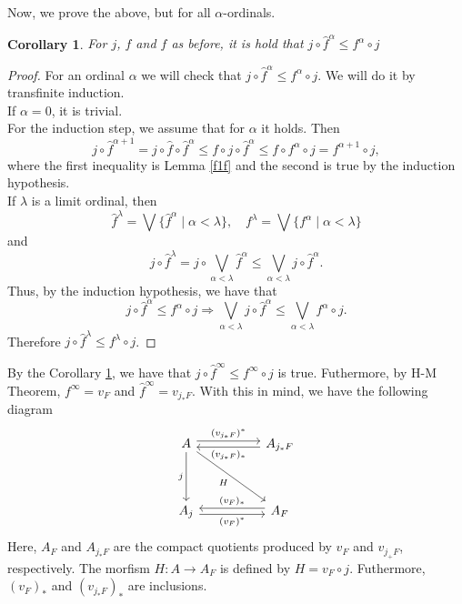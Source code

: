 \documentclass[11pt]{amsart}
\theoremstyle{plain}
\newtheorem{cor}[thm]{Corollary}
\theoremstyle{definition}
\begin{document}
Now, we prove the above, but for all $\alpha$-ordinals.\\

\begin{cor}\label{finftyf}
    For $j$, $f$ and $\hat{f}$ as before, it is hold that $j\circ \hat{f}^\alpha\leq f^\alpha\circ j$
\end{cor}

\begin{proof}
    For an ordinal $\alpha$ we will check that $j\circ \hat{f}^\alpha\leq f^\alpha\circ j$. We will do it by transfinite induction.\\

    If $\alpha=0$, it is trivial.\\

    For the induction step, we assume that for $\alpha$ it holds. Then
    \[
    j\circ \hat{f}^{\alpha+1}=j\circ \hat{f}\circ \hat{f}^{\alpha}\leq  f\circ j\circ \hat{f}^\alpha\leq f\circ f^\alpha\circ j=f^{\alpha+1}\circ j,
    \]
    where the first inequality is Lemma \ref{f1f} and the second is true by the induction hypothesis.\\

    If $\lambda$ is a limit ordinal, then
	\[
	\hat{f}^\lambda=\bigvee\{\hat{f}^\alpha\mid \alpha<\lambda\}, \quad f^\lambda=\bigvee\{f^\alpha\mid \alpha<\lambda\} 
	\]
	and 
	\[
		j\circ \hat{f}^\lambda=j\circ \bigvee_{\alpha<\lambda}\hat{f}^\alpha\leq\bigvee_{\alpha<\lambda}j\circ \hat{f}^\alpha.
	\]
	Thus, by the induction hypothesis, we have that
	\[
	j\circ \hat{f}^\alpha\leq f^\alpha\circ j\Rightarrow \bigvee_{\alpha<\lambda}j\circ \hat{f}^\alpha\leq \bigvee_{\alpha<\lambda} f^\alpha\circ j.
	\]
	Therefore $j\circ \hat{f}^\lambda\leq f^\lambda\circ j$.
\end{proof}

By the Corollary \ref{finftyf}, we have that $j\circ \hat{f}^\infty\leq f^\infty\circ j$ is true. Futhermore, by H-M Theorem, $f^\infty=v_F$ and $\hat{f}^\infty=v_{j_*F}$. With this in mind, we have the following diagram
\[\begin{tikzcd}
	A && {A_{j_*F}} \\
	\\
	{A_j} && {A_F}
	\arrow["{(v_{j_*F})^*}", shift left, from=1-1, to=1-3]
	\arrow["j"', from=1-1, to=3-1]
	\arrow["H"', from=1-1, to=3-3]
	\arrow["{(v_{j_*F})_*}", shift left, from=1-3, to=1-1]
	\arrow["{(v_F)^*}"', shift right, from=3-1, to=3-3]
	\arrow["{(v_F)_*}"', shift right, from=3-3, to=3-1]
\end{tikzcd}\]
Here, $A_F$ and $A_{j_*F}$ are the compact quotients produced by $v_F$ and $v_{j_+F}$, respectively. The morfism $H\colon A\to A_F$ is defined by $H=v_F\circ j$. Futhermore, $(v_F)_*$ and $(v_{j_*F})_*$ are inclusions.\\
\end{document}
